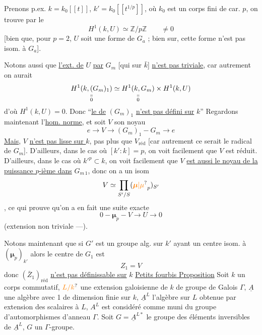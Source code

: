 Prenons p.ex. $k=k_0[[t]]$, $k'=k_0[[t^{1/p}]]$, où $k_0$ est un corps fini de car. $p$, on trouve par le 
\[
H^1(k,U)\simeq\mathbb{Z}/p\mathbb{Z}\qquad\ne0
\]
[bien que, pour $p=2$, $U$ soit une forme de $G_a$ ; bien sur, cette forme n'est pas isom. à $G_a$].

Notons aussi que \uline{l'ext. de} $U$ \uline{par} $G_m$ [qui  sur $\bar k$] \uline{n'est pas triviale}, car autrement on aurait
\[
\underset{\substack{\shortparallel\\0}}{H^1(k,(G_m)_1)}\simeq\underset{\substack{\shortparallel\\0}}{H^1(k,G_m)}\times H^1(k,U)
\]
d'où $H^1(k,U)=0$. Donc ``\uline{le   de} $(G_m)_1$ \uline{n'est pas défini sur} $k$''
Regardons maintenant l'\uline{hom. norme}, et soit $V$ son noyau
\[
e\longrightarrow V\longrightarrow(G_m)_1\mathbin{-}G_m\longrightarrow e
\]
\uline{Mais}, $V$ \uline{n'est pas lisse sur $k$},  \deleted{Mais [dans le cas où \unsure{donc}} pas plus que $V_{\mathrm{réd}}$ [car autrement ce serait le radical  de $G_m$].
D'ailleurs, dans le cas où $[k':k]=p$, on voit facilement que $V$ est réduit. D'ailleurs, dans le cas où $k'^p\subset k$, on voit facilement que $V$ \uline{est aussi le noyau de la puissance $p$-ième dans} $G_{m\,1}$, donc on a un isom
\[
V\simeq\prod_{S'/S}(\unsure{\boldsymbol{\mu}|\mu}_p)_{S'}
\]
, ce qui prouve qu'on a en fait une suite exacte
\[
0\mathbin{-}\boldsymbol{\mu}_p\mathbin{-}V\longrightarrow U\longrightarrow0
\]
(extension non triviale ---).

Notons maintenant que si $G'$ est un groupe alg.  sur $k'$  ayant un centre isom. à $(\boldsymbol{\mu}_p)_{k'}$
alors le centre de $G_1$ est
\[
Z_1=V
\]
donc $(\bar Z_1)_{\mathrm{réd}}$ \uline{n'est pas définissable sur} $k$
\uline{Petits fourbis }
\uline{Proposition} Soit $k$ un corps commutatif, $\unsure{L/k}$ une extension galoisienne de $k$ de groupe de Galois $\Gamma$, $\underline A$ une algèbre avec 1 de dimension finie sur $k$, $\underline A^L$ l'algèbre sur $L$ obtenue par extension des scalaires à $L$, $A^L$ est considéré comme muni du groupe d'automorphismes d'anneau $\Gamma$. Soit $G=\underline A^{L*}$ le groupe des éléments inversibles de $\underline A^L$, $G$  un $\Gamma$-groupe.

